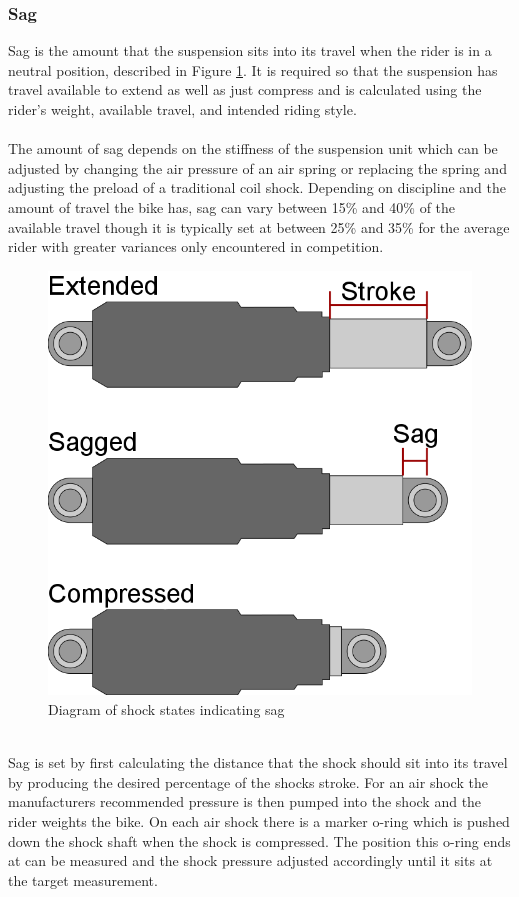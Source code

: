 	\subsubsection{Sag}
		Sag is the amount that the suspension sits into its travel when the rider is in a neutral position, described in Figure \ref{fig:sag}. It is required so that the suspension has travel available to extend as well as just compress and is calculated using the rider’s weight, available travel, and intended riding style.
		\\\\
		The amount of sag depends on the stiffness of the suspension unit which can be adjusted by changing the air pressure of an air spring or replacing the spring and adjusting the preload of a traditional coil shock. Depending on discipline and the	amount of travel the bike has, sag can vary between 15\% and 40\% of the available travel though it is typically set at between 25\% and 35\% for the average rider with greater variances only encountered in competition.
		\begin{figure}[h!]
			\centering
			\includegraphics[scale=0.5]{../images/sag_diagram.png}
			\caption{Diagram of shock states indicating sag}
			\label{fig:sag}
		\end{figure}
		\\
		Sag is set by first calculating the distance that the shock should sit into its travel by producing the desired percentage of the shocks stroke. For an air shock the manufacturers recommended pressure is then pumped into the shock and the rider weights the bike. On each air shock there is a marker o-ring which is pushed down the shock shaft when the shock is compressed. The position this o-ring ends at can be measured and the shock pressure adjusted accordingly until it sits at the target measurement. 
